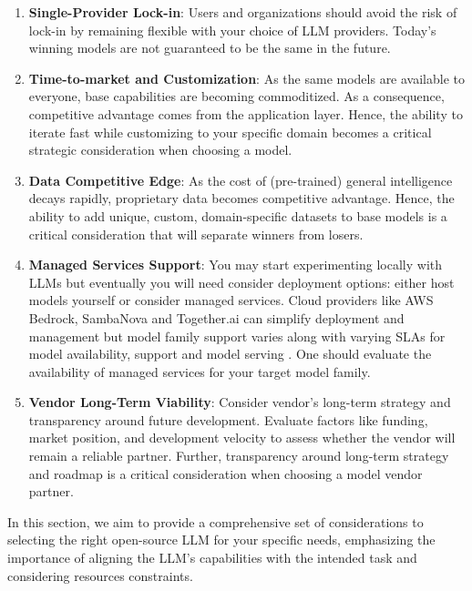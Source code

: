 \begin{enumerate}
    \item \textbf{Single-Provider Lock-in}: Users and organizations should avoid the risk of lock-in by remaining flexible with your choice of LLM providers. Today's winning models are not guaranteed to be the same in the future.

    \item \textbf{Time-to-market and Customization}: As the same models are available to everyone, base capabilities are becoming commoditized. As a consequence, competitive advantage comes from the application layer. Hence, the ability to iterate fast while customizing to your specific domain becomes a critical strategic consideration when choosing a model.

    \item \textbf{Data Competitive Edge}: As the cost of (pre-trained) general intelligence decays rapidly, proprietary data becomes competitive advantage. Hence, the ability to add unique, custom, domain-specific datasets to base models is a critical consideration that will separate winners from losers.

    \item \textbf{Managed Services Support}: You may start experimenting locally with LLMs but eventually you will need consider deployment options: either host models yourself or consider managed services. Cloud providers like AWS Bedrock, SambaNova and Together.ai can simplify deployment and management but model family support varies along with varying SLAs for model availability, support and model serving . One should evaluate the availability of managed services for your target model family. 

    \item \textbf{Vendor Long-Term Viability}: Consider vendor's long-term strategy and transparency around future development. Evaluate factors like funding, market position, and development velocity to assess whether the vendor will remain a reliable partner. Further, transparency around long-term strategy and roadmap is a critical consideration when choosing a model vendor partner.
\end{enumerate}

In this section, we aim to provide a comprehensive set of considerations to selecting the right open-source LLM for your specific needs, emphasizing the importance of aligning the LLM's capabilities with the intended task and considering resources constraints.

